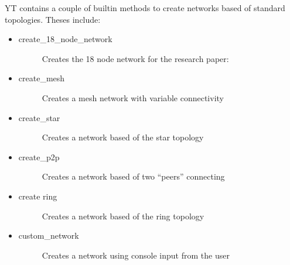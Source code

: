 \documentclass[letterpaper,10pt,english]{sphinxmanual}
\begin{document}
\sphinxAtStartPar
YT contains a couple of builtin methods to create networks based of standard topologies.
Theses include:
\begin{itemize}
\item {} \begin{description}
\item[{create\_18\_node\_network}] \leavevmode
\sphinxAtStartPar
Creates the 18 node network for the research paper: 

\end{description}

\item {} \begin{description}
\item[{create\_mesh}] \leavevmode
\sphinxAtStartPar
Creates a mesh network with variable connectivity

\end{description}

\item {} \begin{description}
\item[{create\_star}] \leavevmode
\sphinxAtStartPar
Creates a network based of the star topology

\end{description}

\item {} \begin{description}
\item[{create\_p2p}] \leavevmode
\sphinxAtStartPar
Creates a network based of two “peers” connecting

\end{description}

\item {} \begin{description}
\item[{create ring}] \leavevmode
\sphinxAtStartPar
Creates a network based of the ring topology

\end{description}

\item {} \begin{description}
\item[{custom\_network}] \leavevmode
\sphinxAtStartPar
Creates a network using console input from the user

\end{description}


\end{itemize}
\end{document}
